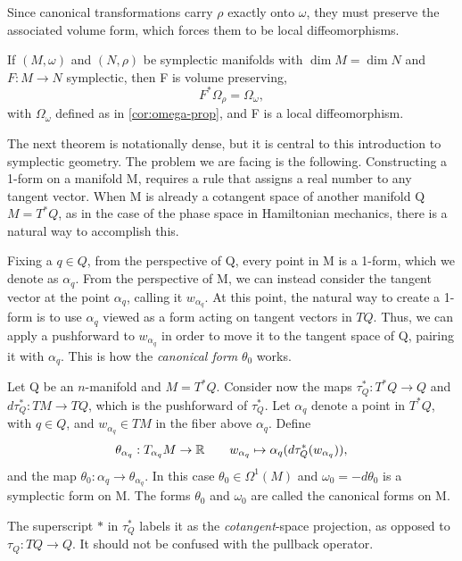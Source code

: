 \noindent Since canonical transformations carry $\rho$ exactly onto $\omega$, they must preserve the associated volume form, which forces them to be local diffeomorphisms.


\begin{proposition}
	If $(M,\omega)$ and $(N,\rho)$ be symplectic manifolds with $\dim M = \dim N$ and $F:M \to N$ symplectic, then F is volume preserving, $$F^*\Omega_\rho=\Omega_\omega,$$ with $\Omega_\omega$ defined as in \ref{cor:omega-prop}, and F is a local diffeomorphism.
\end{proposition}

The next theorem is notationally dense, but it is central to this introduction to symplectic geometry. The problem we are facing is the following. Constructing a 1-form on a manifold M, requires a rule that assigns a real number to any tangent vector. When M is already a cotangent space of another manifold Q $M = T^*Q$, as in the case of the phase space in Hamiltonian mechanics, there is a natural way to accomplish this.

\medskip 
Fixing a $q \in Q$, from the perspective of Q, every point in M is a 1-form, which we denote as $\alpha_q$. From the perspective of M, we can instead consider the tangent vector at the point $\alpha_q$, calling it $w_{\alpha_q}$. 
At this point, the natural way to create a 1-form is to use $\alpha_q$ viewed as a form acting on tangent vectors in $TQ$. Thus, we can apply a pushforward to $w_{\alpha_q}$ in order to move it to the tangent space of Q, pairing it with $\alpha_q$. This is how the \textit{canonical form} $\theta_0$ works.

\begin{theorem}\label{thm:canon}
	Let Q be an $n$-manifold and $M = T^*Q$. Consider now the maps $\tau^*_Q: T^*Q \to Q$ and $d\tau^*_Q: TM \to TQ$, which is the pushforward of $\tau^*_Q$. Let $\alpha_q$ denote a point in $T^*Q$, with $q \in Q$, and $w_{\alpha_q} \in TM$ in the fiber above $\alpha_q$. Define
	\[
		\theta_{\alpha_q} : T_{\alpha_q}M \to \mathbb{R} \qquad w_{\alpha_q} \mapsto \alpha_q(d \tau^*_Q(w_{\alpha_q})),
	\] 
	and the map $\theta_0: \alpha_q \to \theta_{\alpha_q}$. In this case $\theta_0 \in \Omega^1(M)$ and $\omega_0=-d\theta_0$ is a symplectic form on M. The forms $\theta_0$ and $\omega_0$ are called the canonical forms on M.
\end{theorem}

\begin{remark}
	The superscript $*$ in $\tau^*_Q$ labels it as the \emph{cotangent}-space projection, as opposed to $\tau_Q: TQ \to Q$. It should not be confused with the pullback operator. 
\end{remark}

